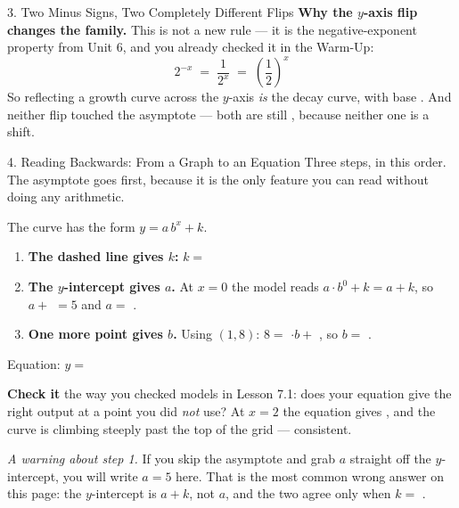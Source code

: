 \documentclass[10pt]{article}
\newcommand{\lgrid}[4]{%
  \draw[step=1, linegray!40, very thin] (#1,#3) grid (#2,#4);
  \draw[->, semithick, charcoal] (#1,0)--(#2,0) node[below right, font=\scriptsize]{$x$};
  \draw[->, semithick, charcoal] (0,#3)--(0,#4) node[left, font=\scriptsize]{$y$};}
\newcommand{\expgraph}[6]{\draw[very thick, forest, domain=#5:#6, samples=140, smooth]
  plot (\x,{(#1)*exp((#2)*((\x)-(#3)))+(#4)});}
\newcommand{\hasym}[3]{\draw[navy, dashed, semithick] (#1,#3)--(#2,#3);}
\begin{document}
\begin{notesbox}{3. Two Minus Signs, Two Completely Different Flips}
\vspace{2pt}
\textbf{Why the $y$-axis flip changes the family.} This is not a new rule --- it is the
negative-exponent property from Unit 6, and you already checked it in the Warm-Up:
\[
  2^{-x} \;=\; \frac{1}{2^{x}} \;=\; \left(\frac{1}{2}\right)^{x}
\]
So reflecting a growth curve across the $y$-axis \emph{is} the decay curve, with base
. And neither flip touched the asymptote --- both are still , because
neither one is a  shift.
\end{notesbox}

\begin{notesbox}{4. Reading Backwards: From a Graph to an Equation}
Three steps, in this order. The asymptote goes first, because it is the only feature you can read
without doing any arithmetic.
\begin{center}
\begin{minipage}[c]{0.44\linewidth}
\centering
{}
\end{minipage}
\begin{minipage}[c]{0.52\linewidth}
\small
The curve has the form $y=a\,b^{x}+k$.
\begin{enumerate}[leftmargin=1.6em, itemsep=4pt]
  \item \textbf{The dashed line gives $k$:} \; $k=$ 
  \item \textbf{The $y$-intercept gives $a$.} At $x=0$ the model reads $a\cdot b^{0}+k = a+k$, so
        $a+$  $=5$ and $a=$ .
  \item \textbf{One more point gives $b$.} Using $(1,8)$: \; $8=$ $\cdot b+$
        , so $b=$ .
\end{enumerate}
Equation: $y=$ 
\end{minipage}
\end{center}

\vspace{2pt}
\textbf{Check it} the way you checked models in Lesson 7.1: does your equation give the right output
at a point you did \emph{not} use? At $x=2$ the equation gives , and the curve is
climbing steeply past the top of the grid --- consistent.

\vspace{3pt}
\emph{A warning about step 1.} If you skip the asymptote and grab $a$ straight off the $y$-intercept,
you will write $a=5$ here. That is the most common wrong answer on this page: the $y$-intercept is
$a+k$, not $a$, and the two agree only when $k=$ .
\end{notesbox}
\end{document}
